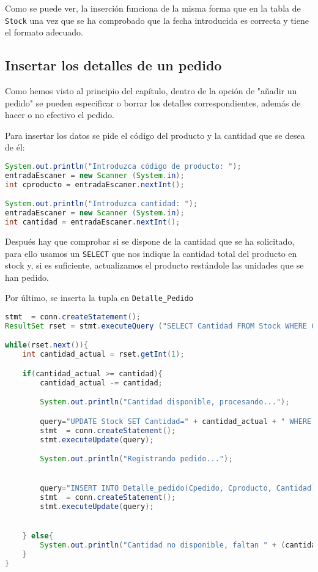 Como se puede ver, la inserción funciona de la misma forma que en la tabla de \texttt{Stock} una vez que se ha comprobado que la fecha introducida es correcta y tiene el formato adecuado.

\subsection{Insertar los detalles de un pedido}
Como hemos visto al principio del capítulo, dentro de la opción de "añadir un pedido" se pueden especificar o borrar los detalles correspondientes, además de hacer o no efectivo el pedido.

Para insertar los datos se pide el código del producto y la cantidad que se desea de él:

\begin{lstlisting}[language=Java]
System.out.println("Introduzca código de producto: ");
entradaEscaner = new Scanner (System.in);
int cproducto = entradaEscaner.nextInt();

System.out.println("Introduzca cantidad: ");
entradaEscaner = new Scanner (System.in);
int cantidad = entradaEscaner.nextInt();

\end{lstlisting}

Después hay que comprobar si se dispone de la cantidad que se ha solicitado, para ello usamos un \texttt{SELECT} que nos indique la cantidad total del producto en stock y, si es suficiente, actualizamos el producto restándole las unidades que se han pedido.

Por último, se inserta la tupla en \texttt{Detalle\_Pedido}

\begin{lstlisting}[language=Java]
stmt  = conn.createStatement();
ResultSet rset = stmt.executeQuery ("SELECT Cantidad FROM Stock WHERE Cproducto='" + cproducto + "'");

while(rset.next()){
	int cantidad_actual = rset.getInt(1);

	if(cantidad_actual >= cantidad){
		cantidad_actual -= cantidad;

		System.out.println("Cantidad disponible, procesando...");

		query="UPDATE Stock SET Cantidad=" + cantidad_actual + " WHERE Cproducto='" + cproducto + "'";
		stmt  = conn.createStatement();
		stmt.executeUpdate(query);

		System.out.println("Registrando pedido...");


		query="INSERT INTO Detalle_pedido(Cpedido, Cproducto, Cantidad) VALUES ((SELECT CPedido FROM Pedido WHERE Cpedido='" + cpedido + "'), (SELECT Cproducto FROM Stock WHERE Cproducto='" + cproducto + "')," + cantidad + ")";
		stmt  = conn.createStatement();
		stmt.executeUpdate(query);


	} else{
		System.out.println("Cantidad no disponible, faltan " + (cantidad-cantidad_actual) + " unidades");
	}
}
\end{lstlisting}

